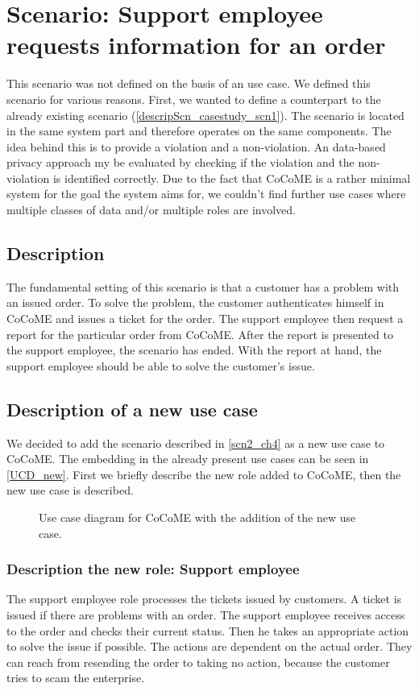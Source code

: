 \section{Scenario: Support employee requests information for an order}
This scenario was not defined on the basis of an use case. We defined this scenario for various reasons. First, we wanted to define a counterpart to the already existing scenario (\autoref{descripScn_casestudy_scn1}). The scenario is located in the same system part and therefore operates on the same components. The idea behind this is to provide a violation and a non-violation. An data-based privacy approach my be evaluated by checking if the violation and the non-violation is identified correctly. Due to the fact that CoCoME is a rather minimal system for the goal the system aims for, we couldn't find further use cases where multiple classes of data and/or multiple roles are involved.
\subsection{Description}
\label{scn2_ch4}
The fundamental setting of this scenario is that a customer has a problem with an issued order. To solve the problem, the customer authenticates himself in CoCoME and issues a ticket for the order. The support employee then request a report for the particular order from CoCoME. After the report is presented to the support employee, the scenario has ended. With the report at hand, the support employee should be able to solve the customer's issue.\\

\subsection{Description of a new use case}
We decided to add the scenario described in \autoref{scn2_ch4} as a new use case to CoCoME. The embedding in the already present use cases can be seen in \autoref{UCD_new}.  First we briefly describe the new role added to CoCoME, then the new use case is described.
\begin{figure}
\caption{Use case diagram for CoCoME with the addition of the new use case.}
\label{UCD_new}
\end{figure}
\subsubsection{Description the new role: Support employee}
The support employee role processes the tickets issued by customers. A ticket is issued if there are problems with an order. The support employee receives access to the order and checks their current status. Then he takes an appropriate action to solve the issue if possible. The actions are dependent on the actual order. They can reach from resending the order to taking no action, because the customer tries to scam the enterprise.

